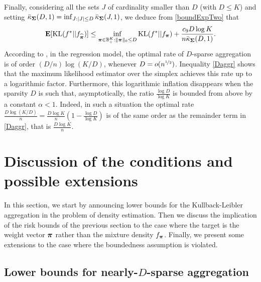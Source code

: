 Finally, considering all the sets $J$ of cardinality smaller than $D$ (with $D\le K$) and
setting $\bar\kappa_{\boldsymbol\Sigma}(D,1) = \inf_{J:|J|\le D} \bar\kappa_{\boldsymbol\Sigma}(J,1)$, we
deduce from \eqref{boundExpTwo} that
\begin{equation}
\mathbf E[{\rm KL}(f^*|| f_{\widehat{\boldsymbol \pi}})] \leq \inf_{\boldsymbol \pi\in {\mathbb B}_+^K : \|\boldsymbol \pi\|_0\le D}
{\rm KL}(f^*|| f_{\boldsymbol \pi}) + \frac{c_9 D\log K}{n\bar\kappa_{\boldsymbol\Sigma}(D,1)}.\label{Daggr}
\end{equation}
According to \citep[Theorem 5.3]{RT11}, in the regression model, the optimal
rate of $D$-sparse aggregation is of order $(D/n)\log(K/D)$, whenever $D=o(n^{\nicefrac12})$.
Inequality \eqref{Daggr} shows that the maximum likelihood estimator over the simplex
achieves this rate up to a logarithmic factor. Furthermore, this logarithmic inflation
disappears when the sparsity $D$ is such that, asymptotically, the ratio $\frac{\log D}{\log K}$
is bounded from above by a constant $\alpha<1$. Indeed, in such a situation the optimal
rate $\frac{D\log(K/D)}{n} = \frac{D\log K}{n}(1-\frac{\log D}{\log K})$ is of the same
order as the remainder term in \eqref{Daggr}, that is $\frac{D\log K}{n}$.


\section[Discussion of the results]{Discussion of the conditions and possible extensions} %
\label{sec:discussion_of_the_results}

In this section, we start by announcing lower bounds for the Kullback-Leibler aggregation
in the problem of density estimation. Then we discuss the implication of the risk bounds of the
previous section to the case where the target is the weight vector $\boldsymbol \pi$ rather than the
mixture density $f_{\boldsymbol \pi}$. Finally, we present some extensions to the case where the boundedness
assumption is violated.

\subsection[Lower bounds]{Lower bounds for nearly-$D$-sparse aggregation}
\label{ssec:lower}

